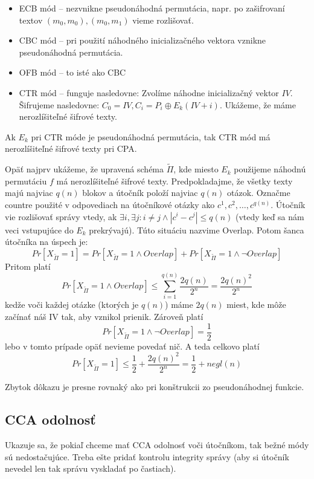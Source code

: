 \begin{itemize}
    \item ECB mód -- nezvnikne pseudonáhodná permutácia, 
        napr. po zašifrovaní textov $(m_0,m_0), (m_0, m_1)$ vieme rozlišovať.
    \item CBC mód -- pri použití náhodného inicializačného vektora 
        vznikne pseudonáhodná permutácia.
    \item OFB mód -- to isté ako CBC
    \item CTR mód -- funguje nasledovne: 
        Zvolíme náhodne inicializačný vektor $IV$.
        Šifrujeme nasledovne: $C_0 = IV, C_i = P_i \oplus E_k(IV + i)$.
        Ukážeme, že máme nerozlíšiteľné šifrové texty.
\end{itemize}
\begin{veta}
    Ak $E_k$ pri CTR móde je pseudonáhodná permutácia,
    tak CTR mód má nerozlíšiteľné šifrové texty pri CPA.
\end{veta}
\begin{dokaz}
    Opäť najprv ukážeme, že upravená schéma $\tilde{\Pi}$,
    kde miesto $E_k$ použijeme náhodnú permutáciu $f$
    má nerozlíšiteľné šifrové texty. 
    Predpokladajme, že všetky texty majú najviac $q(n)$ blokov 
    a útočník položí najviac $q(n)$ otázok.
    Označme countre použité v odpovediach na útočníkové otázky ako 
    $c^1, c^2, \dots, c^{q(n)}$. 
    Útočník vie rozlišovať správy vtedy, ak 
    $\exists i, \exists j \colon i\ne j \land  |c^i - c^j| \leq q(n)$ 
    (vtedy keď sa nám veci vstupujúce do $E_k$ \clqq prekrývajú\crqq).
    Túto situáciu nazvime Overlap.
    Potom šanca útočníka na úspech je:
    \begin{equation*}
        Pr[X_{\tilde{\Pi}} = 1] = 
            Pr[X_{\tilde{\Pi}} = 1 \land Overlap] + 
            Pr[X_{\tilde{\Pi}} = 1 \land \neg Overlap]
    \end{equation*}
    Pritom platí
    \begin{equation*}
        Pr[X_{\tilde{\Pi}} = 1 \land Overlap] \leq 
            \sum_{i=1}^{q(n)} \frac{2q(n)}{2^n} = \frac{2q(n)^2}{2^n}
    \end{equation*}
    kedže voči každej otázke (ktorých je $q(n)$) máme $2q(n)$ miest, 
    kde môže začínať náš IV tak, aby vznikol prienik.
    Zároveň platí
    \begin{equation*}
        Pr[X_{\tilde{\Pi}} = 1 \land \neg Overlap] = \frac{1}{2}
    \end{equation*}
    lebo v tomto prípade opäť nevieme povedať nič.
    A teda celkovo platí
    \begin{equation*}
        Pr[X_{\tilde{\Pi}} = 1] \leq \frac{1}{2} + \frac{2q(n)^2}{2^n} = 
            \frac12 + negl(n)
    \end{equation*}

    Zbytok dôkazu je presne rovnaký ako pri konštrukcii 
    zo pseudonáhodnej funkcie.
\end{dokaz}

\subsection{CCA odolnosť}
Ukazuje sa, že pokiaľ chceme mať CCA odolnosť voči útočníkom,
tak bežné módy sú nedostačujúce.
Treba ešte pridať kontrolu integrity správy 
(aby si útočník nevedel len tak správu vyskladať po častiach).
